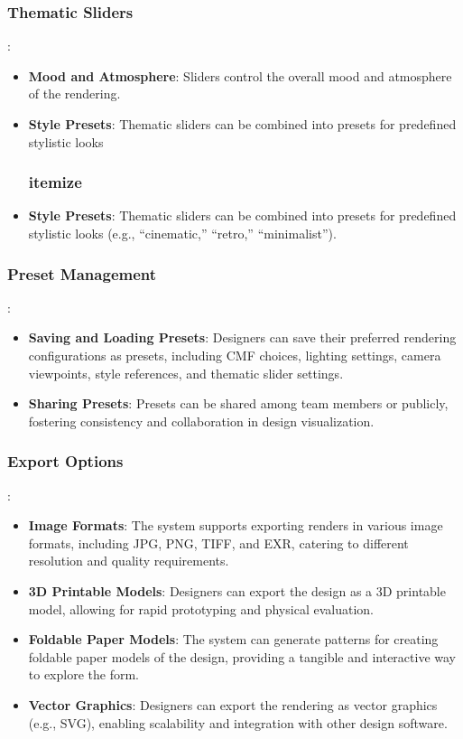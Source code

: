 \documentclass{article}
\begin{document}
\begin{itemize}
\subsubsection{Thematic Sliders}:
\begin{itemize}
    \item \textbf{Mood and Atmosphere}: Sliders control the overall mood and atmosphere of the rendering.
    \item \textbf{Style Presets}: Thematic sliders can be combined into presets for predefined stylistic looks
\subsubsection{itemize}
\item \textbf{Style Presets}: Thematic sliders can be combined into presets for predefined stylistic looks (e.g., “cinematic,” “retro,” “minimalist”).
\end{itemize}

\subsubsection{Preset Management}:
\begin{itemize}
\item \textbf{Saving and Loading Presets}: Designers can save their preferred rendering configurations as presets, including CMF choices, lighting settings, camera viewpoints, style references, and thematic slider settings.
\item \textbf{Sharing Presets}: Presets can be shared among team members or publicly, fostering consistency and collaboration in design visualization.
\end{itemize}

\subsubsection{Export Options}:
\begin{itemize}
\item \textbf{Image Formats}: The system supports exporting renders in various image formats, including JPG, PNG, TIFF, and EXR, catering to different resolution and quality requirements.
\item \textbf{3D Printable Models}: Designers can export the design as a 3D printable model, allowing for rapid prototyping and physical evaluation.
\item \textbf{Foldable Paper Models}: The system can generate patterns for creating foldable paper models of the design, providing a tangible and interactive way to explore the form.
\item \textbf{Vector Graphics}: Designers can export the rendering as vector graphics (e.g., SVG), enabling scalability and integration with other design software.
\end{itemize}


\end{itemize}
\end{document}
